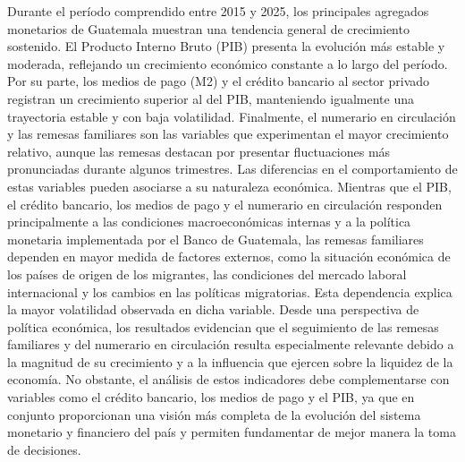 Durante el período comprendido entre 2015 y 2025, los principales agregados monetarios de Guatemala muestran una tendencia general de crecimiento sostenido. El Producto Interno Bruto (PIB) presenta la evolución más estable y moderada, reflejando un crecimiento económico constante a lo largo del período. Por su parte, los medios de pago (M2) y el crédito bancario al sector privado registran un crecimiento superior al del PIB, manteniendo igualmente una trayectoria estable y con baja volatilidad. Finalmente, el numerario en circulación y las remesas familiares son las variables que experimentan el mayor crecimiento relativo, aunque las remesas destacan por presentar fluctuaciones más pronunciadas durante algunos trimestres.
Las diferencias en el comportamiento de estas variables pueden asociarse a su naturaleza económica. Mientras que el PIB, el crédito bancario, los medios de pago y el numerario en circulación responden principalmente a las condiciones macroeconómicas internas y a la política monetaria implementada por el Banco de Guatemala, las remesas familiares dependen en mayor medida de factores externos, como la situación económica de los países de origen de los migrantes, las condiciones del mercado laboral internacional y los cambios en las políticas migratorias. Esta dependencia explica la mayor volatilidad observada en dicha variable.
Desde una perspectiva de política económica, los resultados evidencian que el seguimiento de las remesas familiares y del numerario en circulación resulta especialmente relevante debido a la magnitud de su crecimiento y a la influencia que ejercen sobre la liquidez de la economía. No obstante, el análisis de estos indicadores debe complementarse con variables como el crédito bancario, los medios de pago y el PIB, ya que en conjunto proporcionan una visión más completa de la evolución del sistema monetario y financiero del país y permiten fundamentar de mejor manera la toma de decisiones.